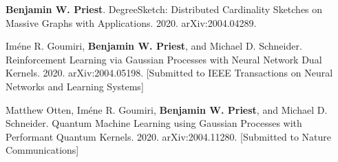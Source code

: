\item \textbf{Benjamin W. Priest}.
	Degree{S}ketch: Distributed Cardinality Sketches on Massive Graphs with Applications. 
	2020.
	arXiv:2004.04289.
	
\item Im\'{e}ne R. Goumiri, \textbf{Benjamin W. Priest}, and Michael D. Schneider.
	Reinforcement Learning via Gaussian Processes with Neural Network Dual Kernels.
	2020.
	arXiv:2004.05198.
	[Submitted to IEEE Transactions on Neural Networks and Learning Systems]
	
\item Matthew Otten, Im\'{e}ne R. Goumiri, \textbf{Benjamin W. Priest}, and Michael D. Schneider.
	Quantum Machine Learning using Gaussian Processes with Performant Quantum Kernels.
	2020.
	arXiv:2004.11280.
	[Submitted to Nature Communications]
